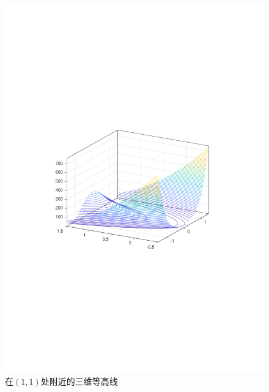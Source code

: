 \documentclass[UTF8]{ctexart}
\begin{document}
\begin{enumerate}
\begin{figure}[H]
\centering
\includegraphics[width=12cm]{fig/0_2.pdf}
\caption{在$(1,1)$处附近的三维等高线}
\end{figure}


\end{enumerate}
\end{document}
